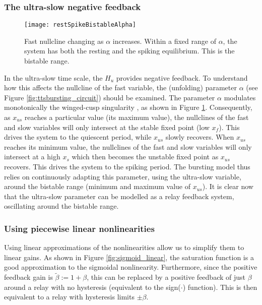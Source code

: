 \documentclass[a4paper, 12pt]{article}
\begin{document}
\subsubsection{The ultra-slow negative feedback}
\begin{figure}[h!]
\texttt{[image: restSpikeBistableAlpha]}
\caption{Fast nullcline changing as $\alpha$ increases. Within a fixed range of $\alpha$, the system has both the resting and the spiking equilibrium. This is the bistable range.}
\label{fig:alphaParameter}
\end{figure}
In the ultra-slow time scale, the $H_{u}$ provides negative feedback. To understand how this affects the nullcline of the fast variable, the (unfolding) parameter $\alpha$ (see Figure \ref{fig:ttsbursting_circuit}) should be examined. The parameter $\alpha$ modulates monotonically the winged-cusp singularity \cite{franci}, as shown in Figure \ref{fig:alphaParameter}. Consequently, as $x_{us}$ reaches a particular value (its maximum value), the nullclines of the fast and slow variables will only intersect at the stable fixed point (low $x_f$). This drives the system to the quiescent period, while $x_{us}$ slowly recovers. When $x_{us}$ reaches its minimum value, the nullclines of the fast and slow variables will only intersect at a high $x_{s}$ which then becomes the unstable fixed point as $x_{us}$ recovers. This drives the system to the spiking period. The bursting model thus relies on continuously adapting this parameter, using the ultra-slow variable, around the bistable range (minimum and maximum value of $x_{us}$). 
It is clear now that the ultra-slow parameter can be modelled as a relay feedback system, oscillating around the bistable range. 


\subsubsection{Using piecewise linear nonlinearities}
Using linear approximations of the nonlinearities allow us to simplify them to linear gains. As shown in Figure \ref{fig:sigmoid_linear}, the saturation function is a good approximation to the sigmoidal nonlinearity. Furthermore, since the positive feedback gain is $\tilde{\beta}:=1 + \beta$, this can be replaced by a positive feedback of just $\beta$ around a relay with no hysteresis (equivalent to the sign($\cdot$) function). This is then equivalent to a relay with hysteresis limits $\pm \beta$. 
\end{document}
